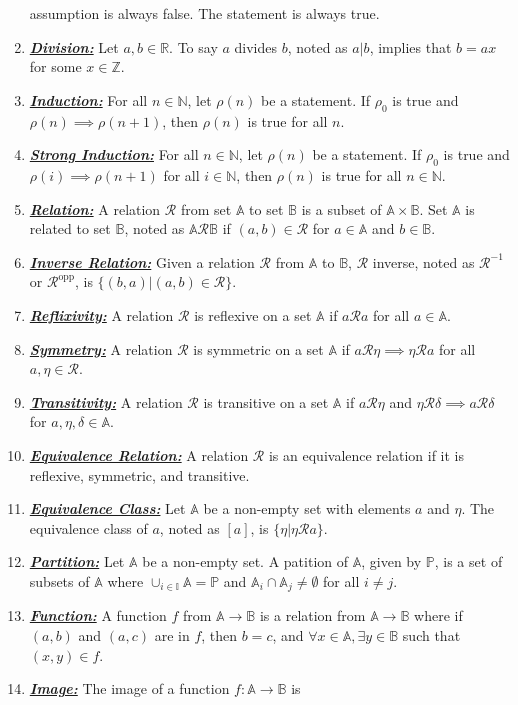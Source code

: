 \documentclass{article}
\newcommand{\deff}[1]{\textbf{\textit{\underline{#1}}}}
\newcommand{\NN}{\mathbb{N}}
\newcommand{\ZZ}{\mathbb{Z}}
\newcommand{\RR}{\mathbb{R}}
\newcommand{\rel}{\mathcal{R}}
\newcommand{\seta}{\mathbb{A}}
\newcommand{\setb}{\mathbb{B}}
\begin{document}
\begin{enumerate}
assumption is always false. The statement is always true.
\item \deff{Division:} Let $a,b\in\RR$. To say $a$ divides $b$, noted as $a|b$,
implies that $b=ax$ for some $x\in\ZZ$.
\item \deff{Induction:} For all $n\in\NN$, let $\rho(n)$ be a statement. If
$\rho_{0}$ is true and $\rho(n)\implies\rho(n + 1)$, then $\rho(n)$ is true for
all $n$.
\item \deff{Strong Induction:} For all $n\in\NN$, let $\rho(n)$ be a statement.
If $\rho_{0}$ is true and $\rho(i)\implies\rho(n+1)$ for all $i\in\NN$, then
$\rho(n)$ is true for all $n\in\NN$.
\item \deff{Relation:} A relation $\rel$ from set $\seta$ to set $\setb$ is a
subset of $\seta\times\setb$. Set $\seta$ is related to set $\setb$, noted as
$\seta\rel\setb$ if $(a,b)\in\rel$ for $a\in\seta$ and $b\in\setb$.
\item \deff{Inverse Relation:} Given a relation $\rel$ from $\seta$ to $\setb$,
$\rel$ inverse, noted as $\rel^{-1}$ or $\rel^{\text{opp}}$, is
$\{(b,a)|(a,b)\in\rel\}$.
\item \deff{Reflixivity:} A relation $\rel$ is reflexive on a set $\seta$ if
$a\rel a$ for all $a\in\seta$.
\item \deff{Symmetry:} A relation $\rel$ is symmetric on a set $\seta$ if
$a\rel\eta\implies\eta\rel a$ for all $a,\eta\in\rel$.
\item \deff{Transitivity:} A relation $\rel$ is transitive on a set $\seta$ if
$a\rel\eta$ and $\eta\rel\delta\implies a\rel\delta$ for $a,\eta,\delta\in\seta$.
\item \deff{Equivalence Relation:} A relation $\rel$ is an equivalence relation
if it is reflexive, symmetric, and transitive.
\item \deff{Equivalence Class:} Let $\seta$ be a non-empty set with elements
$a$ and $\eta$. The equivalence class of $a$, noted as $[a]$, is
$\{\eta|\eta\rel a\}$.
\item \deff{Partition:} Let $\seta$ be a non-empty set. A patition of $\seta$,
given by $\mathbb{P}$, is a set of subsets of $\seta$ where
$\cup_{i\in\mathbb{I}}\seta = \mathbb{P}$ and $\seta_{i}\cap\seta_{j}\neq\emptyset$
for all $i\neq j$.
\item \deff{Function:} A function $f$ from $\seta\to\setb$ is a relation from
$\seta\to\setb$ where if $(a,b)$ and $(a,c)$ are in $f$, then $b=c$, and
$\forall x\in\seta,\exists y\in\setb$ such that $(x,y)\in f$.
\item \deff{Image:} The image of a function $f:\seta\to\setb$ is

\end{enumerate}
\end{document}
